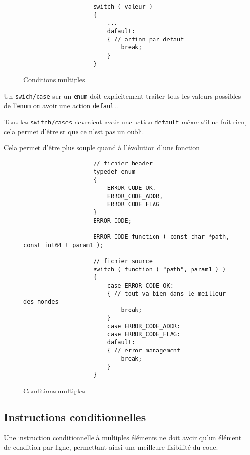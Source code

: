 			\begin{figure}[H]
				\begin{changemargin}{-2.5cm}{-2.5cm}
				\begin{tcolorbox}
				\begin{verbatim}
					switch ( valeur )
					{
					    ...
					    dafault:
					    { // action par defaut
					        break;
					    }
					}
				\end{verbatim}
				\end{tcolorbox}
				\end{changemargin}
				\caption{Conditions multiples}
			\end{figure}

			Un \verb+swich/case+ sur un \verb+enum+ doit explicitement traiter tous les valeurs possibles de l'\verb+enum+ ou avoir une action \verb+default+.
			
			Tous les \verb+switch/cases+ devraient avoir une action \verb+default+ même s'il ne fait rien, cela permet d'être sr que ce n'est pas un oubli.

			Cela permet d’être plus souple quand à l'évolution d'une fonction

			\begin{figure}[H]
				\begin{changemargin}{-2.5cm}{-2.5cm}
				\begin{tcolorbox}
				\begin{verbatim}
					// fichier header
					typedef enum
					{
					    ERROR_CODE_OK,
					    ERROR_CODE_ADDR,
					    ERROR_CODE_FLAG
					}
					ERROR_CODE;

					ERROR_CODE function ( const char *path, const int64_t param1 );

					// fichier source
					switch ( function ( "path", param1 ) )
					{
					    case ERROR_CODE_OK:
					    { // tout va bien dans le meilleur des mondes
					        break;
					    }
					    case ERROR_CODE_ADDR:
					    case ERROR_CODE_FLAG:
					    dafault:
					    { // error management
					        break;
					    }
					}
				\end{verbatim}
				\end{tcolorbox}
				\end{changemargin}
				\caption{Conditions multiples}
			\end{figure}

		\subsection{Instructions conditionnelles}
			Une instruction conditionnelle à multiples éléments ne doit avoir qu'un élément de condition par ligne, permettant ainsi une meilleure lisibilité du code.

